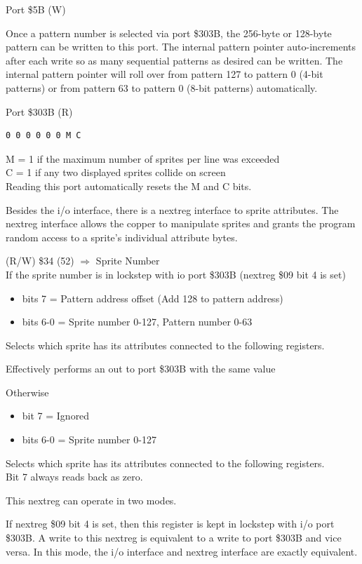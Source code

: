 Port \$5B (W)

Once a pattern number is selected via port \$303B, the 256-byte or
128-byte pattern can be written to this port. The internal pattern
pointer auto-increments after each write so as many sequential
patterns as desired can be written. The internal pattern pointer will
roll over from pattern 127 to pattern 0 (4-bit patterns) or from
pattern 63 to pattern 0 (8-bit patterns) automatically.

Port \$303B (R)

\begin{verbatim}
0 0 0 0 0 0 M C
\end{verbatim}
M = 1 if the maximum number of sprites per line was exceeded\\
C = 1 if any two displayed sprites collide on screen\\
Reading this port automatically resets the M and C bits.

Besides the i/o interface, there is a nextreg interface to sprite
attributes. The nextreg interface allows the copper to manipulate
sprites and grants the program random access to a sprite’s individual
attribute bytes.

(R/W) \$34 (52) $\Rightarrow$ Sprite Number\\
If the sprite number is in lockstep with io port \$303B (nextreg \$09
bit 4 is set)
\begin{itemize}
\item[] bits 7 = Pattern address offset (Add 128 to pattern address)
\item[] bits 6-0 = Sprite number 0-127, Pattern number 0-63
\end{itemize}
Selects which sprite has its attributes connected to the following registers.

Effectively performs an out to port \$303B with the same value

Otherwise
\begin{itemize}
\item[] bit 7 = Ignored
\item[] bits 6-0 = Sprite number 0-127
\end{itemize}
Selects which sprite has its attributes connected to the following registers.\\
Bit 7 always reads back as zero.

This nextreg can operate in two modes.

If nextreg \$09 bit 4 is set, then this register is kept in lockstep
with i/o port \$303B. A write to this nextreg is equivalent to a write
to port \$303B and vice versa. In this mode, the i/o interface and
nextreg interface are exactly equivalent.


